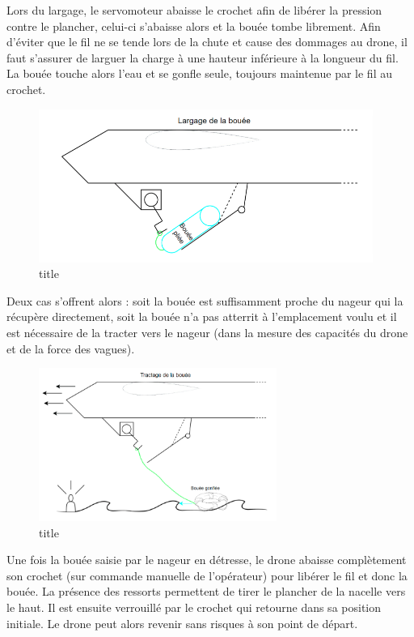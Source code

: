 \documentclass[a4paper,12pt,french]{report}
\begin{document}
Lors du largage, le servomoteur abaisse le crochet afin de libérer la pression contre le plancher, celui-ci s’abaisse alors et la bouée tombe librement. Afin d’éviter que le fil ne se tende lors de la chute et cause des dommages au drone, il faut s’assurer de larguer la charge à une hauteur inférieure à la longueur du fil. La bouée touche alors l’eau et se gonfle seule, toujours maintenue par le fil au crochet.\newline

\begin{figure}[h]
    \centering
    \includegraphics[height=5cm]{figures/b2.png}
    \caption{title}
\end{figure}

Deux cas s’offrent alors : soit la bouée est suffisamment proche du nageur qui la récupère directement, soit la bouée n’a pas atterrit à l’emplacement voulu et il est nécessaire de la tracter vers le nageur (dans la mesure des capacités du drone et de la force des vagues).\newline

\begin{figure}[h]
    \centering
    \includegraphics[height=5cm]{figures/b3.png}
    \caption{title}
\end{figure}

Une fois la bouée saisie par le nageur en détresse, le drone abaisse complètement son crochet (sur commande manuelle de l’opérateur) pour libérer le fil et donc la bouée. La présence des ressorts permettent de tirer le plancher de la nacelle vers le haut. Il est ensuite verrouillé par le crochet qui retourne dans sa position initiale. Le drone peut alors revenir sans risques à son point de départ.\newline
\end{document}
